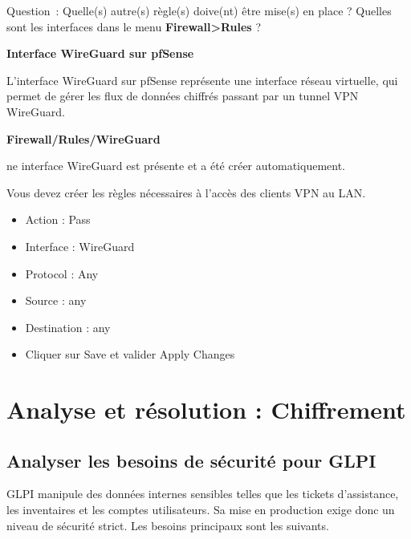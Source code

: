 \vspace{0.5cm}

Question~: Quelle(s) autre(s) règle(s) doive(nt) être mise(s) en place ? Quelles sont les interfaces dans le menu \textbf{Firewall>Rules} ?

\vspace{0.5cm}

\noindent \textbf{Interface WireGuard sur pfSense}

\noindent L’interface WireGuard sur pfSense représente une interface réseau virtuelle, qui permet de gérer les flux de données chiffrés passant par un tunnel VPN WireGuard.

\noindent \textbf{Firewall/Rules/WireGuard}

\noindent ne interface WireGuard est présente et a été créer automatiquement.

\noindent Vous devez créer les règles nécessaires à l'accès des clients VPN au LAN.

\begin{itemize}
  \item Action : Pass
  \item Interface : WireGuard
  \item Protocol : Any
  \item Source : any
  \item Destination : any
  \item Cliquer sur Save et valider Apply Changes
\end{itemize}

\newpage

\section*{Analyse et résolution : Chiffrement}

\subsection*{Analyser les besoins de sécurité pour GLPI}
{}

\noindent GLPI manipule des données internes sensibles telles que les tickets d'assistance, les inventaires et les comptes utilisateurs. Sa mise en production exige donc un niveau de sécurité strict. Les besoins principaux sont les suivants.

